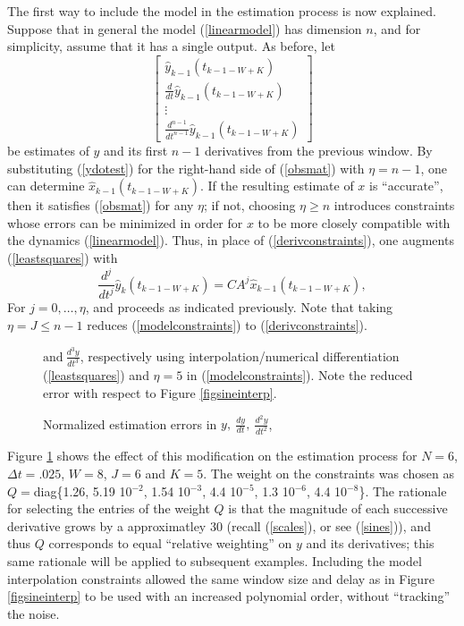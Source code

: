 The first way to include the model in the estimation process is now
explained.  Suppose that in general the model (\ref{linearmodel}) has dimension
$n$, and for simplicity, assume that it has a single output.
As before, let
\begin{equation}
\left[ \begin{array}{c} 
\hat{y}_{k-1}(t_{k-1-W+K}) \\
\frac{d}{dt} \hat{y}_{k-1}(t_{k-1-W+K}) \\ 
\vdots \\ 
\frac{d^{n-1}}{dt^{n-1}} \hat{y}_{k-1}(t_{k-1-W+K})
\end{array} \right]
\label{ydotest}
\end{equation}
be estimates of $y$ and its first $n-1$ derivatives from the previous window.
By substituting (\ref{ydotest}) for the right-hand side of (\ref{obsmat}) with
$\eta = n-1$, one can
determine $\hat{x}_{k-1}(t_{k-1-W+K})$. 
If the resulting estimate of $x$ is ``accurate'', then it satisfies (\ref{obsmat}) for
any $\eta$; if not, choosing $\eta \ge n$ introduces constraints whose
errors can be minimized in order for $x$ to be more closely compatible
with the dynamics (\ref{linearmodel}).  Thus, in place of
(\ref{derivconstraints}),
one augments (\ref{leastsquares}) with
\begin{equation}
\frac{d^j}{dt^j} \hat{y}_k(t_{k-1-W+K}) = CA^j  \hat{x}_{k-1}(t_{k-1-W+K}),
\label{modelconstraints}
\end{equation}
For $j=0, \ldots, \eta$, and proceeds as indicated previously.  
Note that taking $\eta =J \le n-1$ reduces 
(\ref{modelconstraints}) to (\ref{derivconstraints}).



\begin{figure}[hbt]
\centerline{}
\smallskip
\caption{\small Normalized estimation errors in $y, \ \frac{dy}{dt}, \
\frac{d^2y}{dt^2}$,}
$ \mbox{and} \
\frac{d^3y}{dt^3}$, respectively using interpolation/numerical differentiation
(\protect\ref{leastsquares}) and $\eta=5$ in (\protect\ref{modelconstraints}).  Note the reduced error with respect to
Figure \protect\ref{figsineinterp}. 
\label{figsinesplineorder5}
\end{figure}


Figure \ref{figsinesplineorder5} shows the
effect of this modification on the estimation process for $N=6$, $\Delta t = .025$, 
$W=8$, $J=6$ and $K=5$.  The weight on the constraints was chosen as 
$ Q =$diag\{1.26, 5.19 10$^{-2}$, 1.54 10$^{-3}$, 4.4 10$^{-5}$, 1.3 10$^{-6}$,
4.4 10$^{-8}$\}.
The rationale for
selecting the entries of the
weight $Q$ is that the magnitude of each successive derivative grows by a
approximatley
30 (recall (\ref{scales}), or see (\ref{sines})), 
and thus $Q$ corresponds to equal ``relative
weighting'' on $y$ and its derivatives;
this same rationale will be applied to subsequent examples. Including the model
interpolation constraints allowed the same window size and delay as in Figure
\ref{figsineinterp} to be used with an increased polynomial order, without
``tracking'' the noise.



